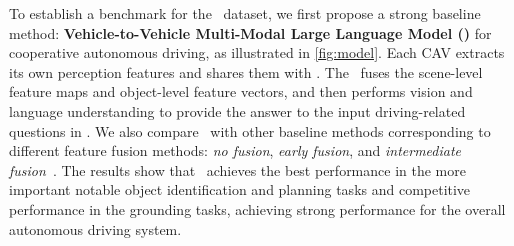 To establish a benchmark for the \namedataset~dataset, we first propose a strong baseline method: \textbf{Vehicle-to-Vehicle Multi-Modal Large Language Model (\namemethod)} for cooperative autonomous driving, as illustrated in \cref{fig:model}. Each CAV extracts its own perception features and shares them with \namemethod. The \namemethod~fuses the scene-level feature maps and object-level feature vectors, and then performs vision and language understanding to provide the answer to the input driving-related questions in \namedataset. 
We also compare \namemethod~with other baseline methods corresponding to different feature fusion methods: \textit{no fusion}, \textit{early fusion}, and \textit{intermediate fusion}~\cite{xu2023v2v4real, xiang2024v2xreal, xu2022opencood, xu2022v2xvit, xu2022cobevt}. The results show that \namemethod~achieves the best performance in the more important notable object identification and planning tasks and competitive performance in the grounding tasks, achieving strong performance for the overall autonomous driving system.

